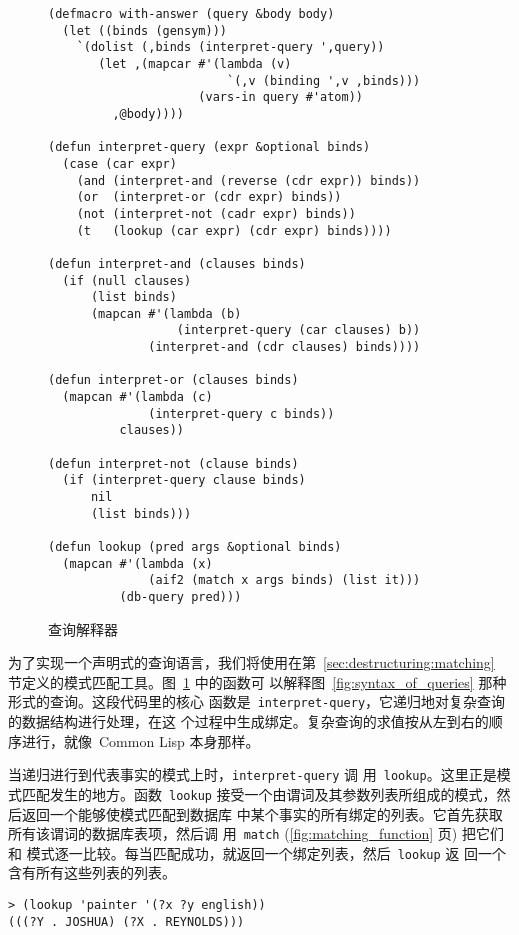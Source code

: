 \begin{figure}
\begin{lstlisting}
(defmacro with-answer (query &body body)
  (let ((binds (gensym)))
    `(dolist (,binds (interpret-query ',query))
       (let ,(mapcar #'(lambda (v)
                         `(,v (binding ',v ,binds)))
                     (vars-in query #'atom))
         ,@body))))

(defun interpret-query (expr &optional binds)
  (case (car expr)
    (and (interpret-and (reverse (cdr expr)) binds))
    (or  (interpret-or (cdr expr) binds))
    (not (interpret-not (cadr expr) binds))
    (t   (lookup (car expr) (cdr expr) binds))))

(defun interpret-and (clauses binds)
  (if (null clauses)
      (list binds)
      (mapcan #'(lambda (b)
                  (interpret-query (car clauses) b))
              (interpret-and (cdr clauses) binds))))

(defun interpret-or (clauses binds)
  (mapcan #'(lambda (c)
              (interpret-query c binds))
          clauses))

(defun interpret-not (clause binds)
  (if (interpret-query clause binds)
      nil
      (list binds)))

(defun lookup (pred args &optional binds)
  (mapcan #'(lambda (x)
              (aif2 (match x args binds) (list it)))
          (db-query pred)))
\end{lstlisting}
  \caption{查询解释器}
  \label{fig:query_interpreter}
\end{figure}

为了实现一个声明式的查询语言，我们将使用在第~\ref{sec:destructuring:matching}
节定义的模式匹配工具。图~\ref{fig:query_interpreter} 中的函数可
以解释图~\ref{fig:syntax_of_queries} 那种形式的查询。这段代码里的核心
函数是~\texttt{interpret-query}，它递归地对复杂查询的数据结构进行处理，在这
个过程中生成绑定。复杂查询的求值按从左到右的顺序进行，就像~Common Lisp 本身那样。

当递归进行到代表事实的模式上时，\texttt{interpret-query} 调
用~\texttt{lookup}。这里正是模式匹配发生的地方。函数~\texttt{lookup}
接受一个由谓词及其参数列表所组成的模式，然后返回一个能够使模式匹配到数据库
中某个事实的所有绑定的列表。它首先获取所有该谓词的数据库表项，然后调
用~\texttt{match} (\ref{fig:matching_function} 页) 把它们和
模式逐一比较。每当匹配成功，就返回一个绑定列表，然后~\texttt{lookup} 返
回一个含有所有这些列表的列表。
\begin{lstlisting}
> (lookup 'painter '(?x ?y english))
(((?Y . JOSHUA) (?X . REYNOLDS)))
\end{lstlisting}

